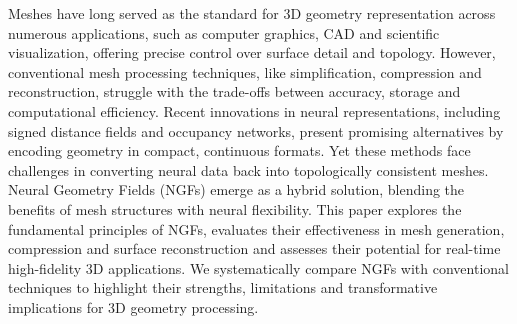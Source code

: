 Meshes have long served as the standard for 3D geometry representation across numerous applications, such as computer graphics, CAD and scientific visualization, offering precise control over surface detail and topology.  
However, conventional mesh processing techniques, like simplification, compression and reconstruction, struggle with the trade-offs between accuracy, storage and computational efficiency.  
Recent innovations in neural representations, including signed distance fields and occupancy networks, present promising alternatives by encoding geometry in compact, continuous formats.  
Yet these methods face challenges in converting neural data back into topologically consistent meshes.  
Neural Geometry Fields (NGFs) emerge as a hybrid solution, blending the benefits of mesh structures with neural flexibility.  
This paper explores the fundamental principles of NGFs, evaluates their effectiveness in mesh generation, compression and surface reconstruction and assesses their potential for real-time high-fidelity 3D applications.  
We systematically compare NGFs with conventional techniques to highlight their strengths, limitations and transformative implications for 3D geometry processing.
